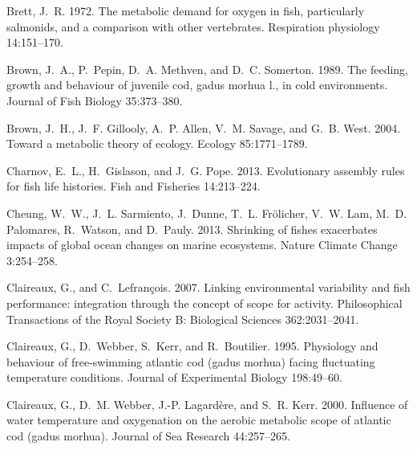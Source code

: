 \documentclass[11pt]{article}\usepackage[]{graphicx}\usepackage[]{color,soul}
\begin{document}
\begin{thebibliography}{55}
Brett, J.~R. 1972.
\newblock The metabolic demand for oxygen in fish, particularly salmonids, and
  a comparison with other vertebrates.
\newblock Respiration physiology 14:151--170.

Brown, J.~A., P.~Pepin, D.~A. Methven, and D.~C. Somerton. 1989.
\newblock The feeding, growth and behaviour of juvenile cod, gadus morhua l.,
  in cold environments.
\newblock Journal of Fish Biology 35:373--380.

Brown, J.~H., J.~F. Gillooly, A.~P. Allen, V.~M. Savage, and G.~B. West. 2004.
\newblock Toward a metabolic theory of ecology.
\newblock Ecology 85:1771--1789.

Charnov, E.~L., H.~Gislason, and J.~G. Pope. 2013.
\newblock Evolutionary assembly rules for fish life histories.
\newblock Fish and Fisheries 14:213--224.

Cheung, W.~W., J.~L. Sarmiento, J.~Dunne, T.~L. Frölicher, V.~W. Lam, M.~D.
  Palomares, R.~Watson, and D.~Pauly. 2013.
\newblock Shrinking of fishes exacerbates impacts of global ocean changes on
  marine ecosystems.
\newblock Nature Climate Change 3:254--258.

Claireaux, G., and C.~Lefrançois. 2007.
\newblock Linking environmental variability and fish performance: integration
  through the concept of scope for activity.
\newblock Philosophical Transactions of the Royal Society B: Biological
  Sciences 362:2031--2041.

Claireaux, G., D.~Webber, S.~Kerr, and R.~Boutilier. 1995.
\newblock Physiology and behaviour of free-swimming atlantic cod (gadus morhua)
  facing fluctuating temperature conditions.
\newblock Journal of Experimental Biology 198:49--60.

Claireaux, G., D.~M. Webber, J.-P. Lagardère, and S.~R. Kerr. 2000.
\newblock Influence of water temperature and oxygenation on the aerobic
  metabolic scope of atlantic cod (gadus morhua).
\newblock Journal of Sea Research 44:257--265.


\end{thebibliography}
\end{document}
